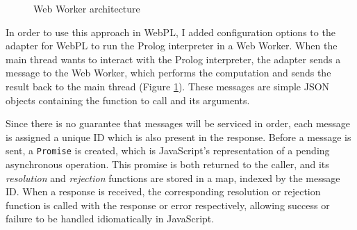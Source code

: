 \begin{figure}[H]
\centering
{}
\caption{Web Worker architecture}
\label{fig:web-worker-arch}
\end{figure}

\vspace*{-1.5em}

In order to use this approach in WebPL, I added configuration options to the adapter for WebPL to run the Prolog interpreter in a Web Worker. When the main thread wants to interact with the Prolog interpreter, the adapter sends a message to the Web Worker, which performs the computation and sends the result back to the main thread (Figure \ref{fig:web-worker-arch}). These messages are simple JSON objects containing the function to call and its arguments.

Since there is no guarantee that messages will be serviced in order, each message is assigned a unique ID which is also present in the response. Before a message is sent, a \texttt{Promise} is created, which is JavaScript's representation of a pending asynchronous operation. This promise is both returned to the caller, and its \emph{resolution} and \emph{rejection} functions are stored in a map, indexed by the message ID. When a response is received, the corresponding resolution or rejection function is called with the response or error respectively, allowing success or failure to be handled idiomatically in JavaScript.